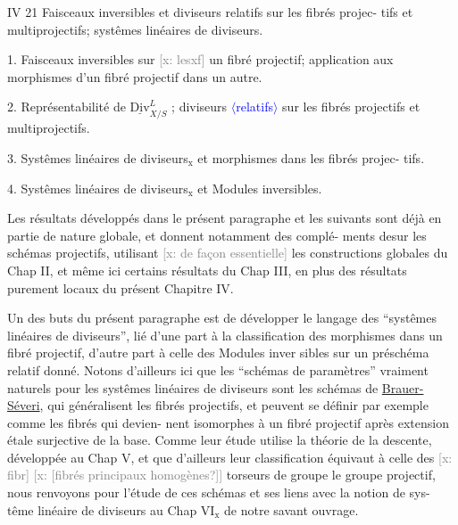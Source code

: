 \documentclass[11pt]{article}
\newcommand{\scanpage}[1]{\par\bigskip\noindent{\small\sffamily[scan #1]}\par}
\newcommand{\mspage}[1]{{\small\sffamily[p.\,#1]}}
\newcommand{\hand}[1]{\textcolor{blue}{#1}}
\newcommand{\inserted}[2][]{\textcolor{blue}{$\langle$#2$\rangle$}}
\newcommand{\xout}[1]{\textcolor{gray}{[\textsf{x:} #1]}}
\newcommand{\uline}[1]{\underline{#1}}
\newcommand{\unsure}[1]{[#1?]}
\begin{document}
\mspage{\hand{136}}

\clearpage
\scanpage{25/137}
\mspage{\hand{40}}

IV 21 Faisceaux inversibles et diviseurs relatifs sur les fibrés projec-%
tifs et multiprojectifs; systêmes linéaires de diviseurs.

1. Faisceaux inversibles sur \xout{lesxf} un fibré projectif; application aux
morphismes d'un fibré projectif dans un autre.

2. Représentabilité de $\underline{\mathrm{Div}}^{L}_{X/S}$ ; diviseurs \inserted[typed]{relatifs} sur les fibrés projectifs et
multiprojectifs.

3. Systêmes linéaires de diviseurs$_{\mathrm{x}}$ et morphismes dans les fibrés projec-%
tifs.

4. Systêmes linéaires de diviseurs$_{\mathrm{x}}$ et Modules inversibles.

Les résultats développés dans le présent paragraphe et les suivants
sont déjà en partie de nature globale, et donnent notamment des complé-%
ments desur les schémas projectifs, utilisant \xout{de façon essentielle} les
constructions globales du Chap II, et même ici certains résultats du
Chap III, en plus des résultats purement locaux du présent Chapitre IV.

Un des buts du présent paragraphe est de développer le langage des
``systêmes linéaires de diviseurs'', lié d'une part à la classification des
morphismes dans un fibré projectif, d'autre part à celle des Modules inver
sibles sur un préschéma relatif donné. Notons d'ailleurs ici que les
``schémas de paramètres'' vraiment naturels pour les systêmes linéaires de
diviseurs sont les schémas de \uline{Brauer-Séveri}, qui généralisent les fibrés
projectifs, et peuvent se définir par exemple comme les fibrés qui devien-%
nent isomorphes à un fibré projectif après extension étale surjective de
la base. Comme leur étude utilise la théorie de la descente, développée
au Chap V, et que d'ailleurs leur classification équivaut à celle des \xout{fibr}
\xout{\unsure{fibrés principaux homogènes}} torseurs de groupe le groupe projectif, nous
renvoyons pour l'étude de ces schémas et ses liens avec la notion de sys-%
tême linéaire de diviseurs au Chap VI$_{\mathrm{x}}$ de notre savant ouvrage.
\end{document}
